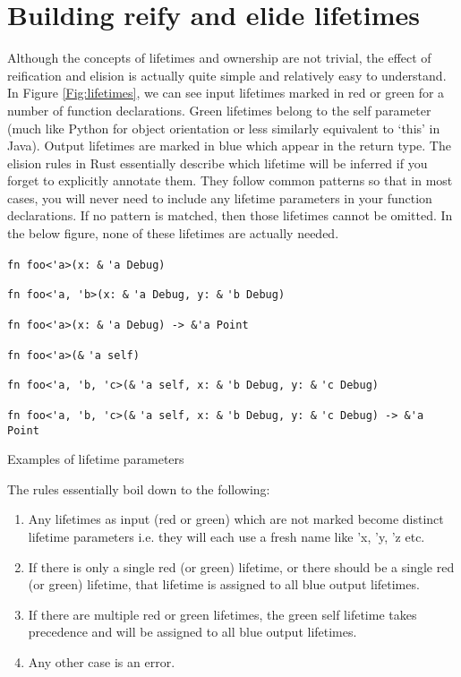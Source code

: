 \section{Building reify and elide lifetimes}\label{S:buildreielide}
Although the concepts of lifetimes and ownership are not trivial, the effect of reification and elision is actually quite simple and relatively easy to understand. In Figure \ref{Fig:lifetimes}, we can see input lifetimes marked in red or green for a number of function declarations. Green lifetimes belong to the self parameter (much like Python for object orientation or less similarly equivalent to `this' in Java). Output lifetimes are marked in blue which appear in the return type. The elision rules in Rust essentially describe which lifetime will be inferred if you forget to explicitly annotate them. They follow common patterns so that in most cases, you will never need to include any lifetime parameters in your function declarations. If no pattern is matched, then those lifetimes cannot be omitted. In the below figure, none of these lifetimes are actually needed.

\begin{fig}
{\verb|fn foo<'a>(x: &|}
{\color{red} \verb|'a|}{\verb| Debug)|}

{\verb|fn foo<'a, 'b>(x: &|}
{\color{red} \verb|'a|}{\verb| Debug, y: &|}{\color{red} \verb|'b|}{\verb| Debug)|}

{\verb|fn foo<'a>(x: &|}
{\color{red} \verb|'a|}{\verb| Debug) -> &|}{\color{blue}\verb|'a|}{\verb| Point|}

{\verb|fn foo<'a>(&|}
{\color{green} \verb|'a|}{\verb| self)|}

{\verb|fn foo<'a, 'b, 'c>(&|}
{\color{green} \verb|'a|}{\verb| self, x: &|}{\color{red} \verb|'b|}{\verb| Debug, y: &|}
{\color{red} \verb|'c|}{\verb| Debug)|}

{\verb|fn foo<'a, 'b, 'c>(&|}
{\color{green} \verb|'a|}{\verb| self, x: &|}{\color{red} \verb|'b|}{\verb| Debug, y: &|}
{\color{red}\verb|'c|}{\verb| Debug) -> &|}{\color{blue}\verb|'a|}{\verb| Point|}

\caption{Examples of lifetime parameters}
\label{Fig:lifetimes}
\end{fig}

The rules essentially boil down to the following:
\begin{enumerate}
\item Any lifetimes as input (red or green) which are not marked become distinct lifetime parameters i.e. they will each use a fresh name like 'x, 'y, 'z etc.
\item If there is only a single red (or green) lifetime, or there should be a single red (or green) lifetime, that lifetime is assigned to all blue output lifetimes.
\item If there are multiple red or green lifetimes, the green self lifetime takes precedence and will be assigned to all blue output lifetimes.
\item Any other case is an error.
\end{enumerate}

